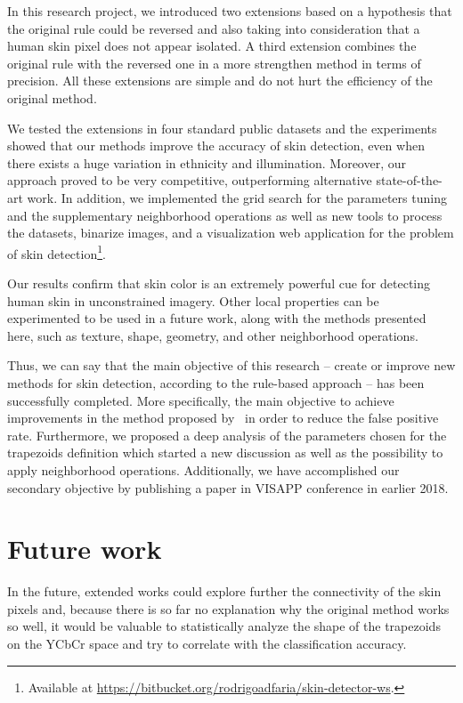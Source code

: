 In this research project, we introduced two extensions based on a hypothesis that the original rule could be reversed and also taking into consideration that a human skin pixel does not appear isolated. A third extension combines the original rule with the reversed one in a more strengthen method in terms of precision. All these extensions are simple and do not hurt the efficiency of the original method.

We tested the extensions in four standard public datasets and the experiments showed that our methods improve the accuracy of skin detection, even when there exists a huge variation in ethnicity and illumination. Moreover, our approach proved to be very competitive, outperforming alternative state-of-the-art work. In addition, we implemented the grid search for the parameters tuning and the supplementary neighborhood operations as well as new tools to process the datasets, binarize images, and a visualization web application for the problem of skin detection\footnote{Available at \url{https://bitbucket.org/rodrigoadfaria/skin-detector-ws}.}.

Our results confirm that skin color is an extremely powerful cue for detecting human skin in unconstrained imagery. Other local properties can be experimented to be used in a future work, along with the methods presented here, such as texture, shape, geometry, and other neighborhood operations.

Thus, we can say that the main objective of this research -- create or improve new methods for skin detection, according to the rule-based approach -- has been successfully completed. More specifically, the main objective to achieve improvements in the method proposed by~\citet{brancati:17} in order to reduce the false positive rate. Furthermore, we proposed a deep analysis of the parameters chosen for the trapezoids definition which started a new discussion as well as the possibility to apply neighborhood operations. Additionally, we have accomplished our secondary objective by publishing a paper in VISAPP conference in earlier 2018.


\section{Future work}
\label{sec:future_work}

In the future, extended works could explore further the connectivity of the skin pixels and, because there is so far no explanation why the original method works so well, it would be valuable to statistically analyze the shape of the trapezoids on the YCbCr space and try to correlate with the classification accuracy.

